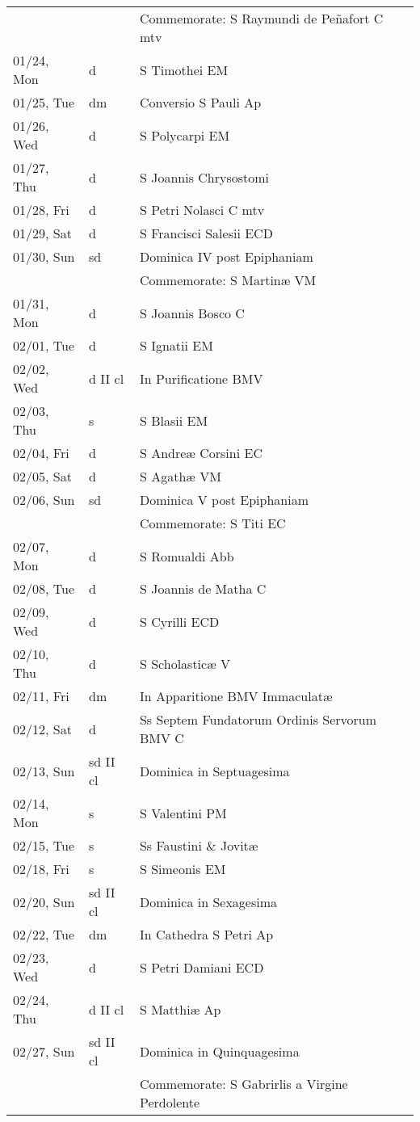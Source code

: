 \documentclass{article}
\begin{document}
\begin{longtable}{ l l l }
 & & Commemorate: S Raymundi de Peñafort C mtv\\
01/24, Mon & d & S Timothei EM\\
01/25, Tue & dm & Conversio S Pauli Ap\\
01/26, Wed & d & S Polycarpi EM\\
01/27, Thu & d & S Joannis Chrysostomi\\
01/28, Fri & d & S Petri Nolasci C mtv\\
01/29, Sat & d & S Francisci Salesii ECD\\
01/30, Sun & sd & Dominica IV post Epiphaniam\\
 & & Commemorate: S Martinæ VM\\
01/31, Mon & d & S Joannis Bosco C\\
02/01, Tue & d & S Ignatii EM\\
02/02, Wed & d II cl & In Purificatione BMV\\
02/03, Thu & s & S Blasii EM\\
02/04, Fri & d & S Andreæ Corsini EC\\
02/05, Sat & d & S Agathæ VM\\
02/06, Sun & sd & Dominica V post Epiphaniam\\
 & & Commemorate: S Titi EC\\
02/07, Mon & d & S Romualdi Abb\\
02/08, Tue & d & S Joannis de Matha C\\
02/09, Wed & d & S Cyrilli ECD\\
02/10, Thu & d & S Scholasticæ V\\
02/11, Fri & dm & In Apparitione BMV Immaculatæ\\
02/12, Sat & d & Ss Septem Fundatorum Ordinis Servorum BMV C\\
02/13, Sun & sd II cl & Dominica in Septuagesima\\
02/14, Mon & s & S Valentini PM\\
02/15, Tue & s & Ss Faustini \& Jovitæ\\
02/18, Fri & s & S Simeonis EM\\
02/20, Sun & sd II cl & Dominica in Sexagesima\\
02/22, Tue & dm & In Cathedra S Petri Ap\\
02/23, Wed & d & S Petri Damiani ECD\\
02/24, Thu & d II cl & S Matthiæ Ap\\
02/27, Sun & sd II cl & Dominica in Quinquagesima\\
 & & Commemorate: S Gabrirlis a Virgine Perdolente\\

\end{longtable}
\end{document}
